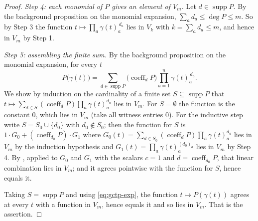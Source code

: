 \begin{proof}
\emph{Step 4: each monomial of $P$ gives an element of $V_m$.} Let
$d\in\operatorname{supp}P$. By the background proposition on the monomial
expansion, $\sum_a d_a\le\deg P\le m$. So by Step 3 the function
$t\mapsto\prod_a\gamma(t)_a^{\,d_a}$ lies in $V_k$ with $k=\sum_ad_a\le m$, and
hence in $V_m$ by Step 1.

\emph{Step 5: assembling the finite sum.} By the background proposition on the
monomial expansion, for every $t$
\begin{equation}\label{eq:gctp-exp}
  P\bigl(\gamma(t)\bigr)
  =\sum_{d\in\operatorname{supp}P}\bigl(\operatorname{coeff}_dP\bigr)
    \prod_{a=1}^{n}\gamma(t)_a^{\,d_a}.
\end{equation}
We show by induction on the cardinality of a finite set
$S\subseteq\operatorname{supp}P$ that
$t\mapsto\sum_{d\in S}(\operatorname{coeff}_dP)\prod_a\gamma(t)_a^{d_a}$ lies in
$V_m$. For $S=\emptyset$ the function is the constant $0$, which lies in $V_m$
(take all witness entries $0$). For the inductive step write
$S=S_0\cup\{d_0\}$ with $d_0\notin S_0$; then the function for $S$ is
$1\cdot G_0+(\operatorname{coeff}_{d_0}P)\cdot G_1$ where
$G_0(t)=\sum_{d\in S_0}(\operatorname{coeff}_dP)\prod_a\gamma(t)_a^{d_a}$ lies in
$V_m$ by the induction hypothesis and
$G_1(t)=\prod_a\gamma(t)_a^{(d_0)_a}$ lies in $V_m$ by Step 4. By
, applied to $G_0$ and $G_1$ with the scalars
$c=1$ and $d=\operatorname{coeff}_{d_0}P$, that linear combination lies in
$V_m$; and it agrees pointwise with the function for $S$, hence equals it.

Taking $S=\operatorname{supp}P$ and using \eqref{eq:gctp-exp}, the function
$t\mapsto P(\gamma(t))$ agrees at every $t$ with a function in $V_m$, hence
equals it and so lies in $V_m$. That is the assertion.
\end{proof}
